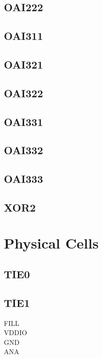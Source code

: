 \documentclass[10pt,a4paper,twoside]{report}
\begin{document}
\section{OAI222}

\clearpage

\section{OAI311}

\clearpage

\section{OAI321}

\clearpage

\section{OAI322}

\clearpage

\section{OAI331}

\clearpage

\section{OAI332}

\clearpage

\section{OAI333}

\clearpage


\section{XOR2}

\clearpage

\onecolumn

\chapter{Physical Cells}
\clearpage

\twocolumn

\section{TIE0}

\clearpage

\section{TIE1}

\clearpage

FILL \\
VDDIO \\
GND \\
ANA

\onecolumn
\end{document}
